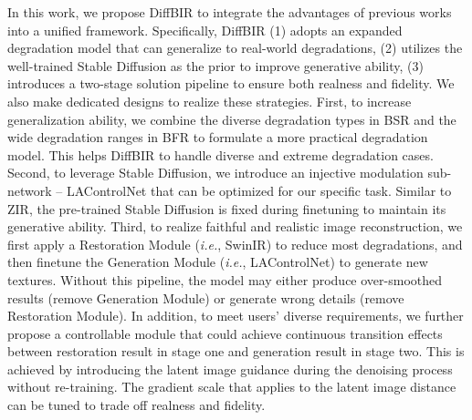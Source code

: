 \documentclass{article}
\begin{document}
In this work, we propose DiffBIR to integrate the advantages of previous works into a unified framework. Specifically, DiffBIR (1) adopts an expanded degradation model that can generalize to real-world degradations, (2) utilizes the well-trained Stable Diffusion as the prior to improve generative ability, (3) introduces a two-stage solution pipeline to ensure both realness and fidelity. We also make dedicated designs to realize these strategies. First, to increase generalization ability, we combine the diverse degradation types in BSR and the wide degradation ranges in BFR to formulate a more practical degradation model. This helps DiffBIR to handle diverse and extreme degradation cases. Second, to leverage Stable Diffusion, we introduce an injective modulation sub-network -- LAControlNet that can be optimized for our specific task. Similar to ZIR, the pre-trained Stable Diffusion is fixed during finetuning to maintain its generative ability. Third, to realize faithful and realistic image reconstruction, we first apply a Restoration Module (\textit{i.e.}, SwinIR) to reduce most degradations, and then finetune the Generation Module (\textit{i.e.}, LAControlNet) to generate new textures. Without this pipeline, the model may either produce over-smoothed results (remove Generation Module) or generate wrong details (remove Restoration Module). In addition, to meet users' diverse requirements, we further propose a controllable module that could achieve continuous transition effects between restoration result in stage one and generation result in stage two. This is achieved by introducing the latent image guidance during the denoising process without re-training. The gradient scale that applies to the latent image distance can be tuned to trade off realness and fidelity. 
\end{document}
